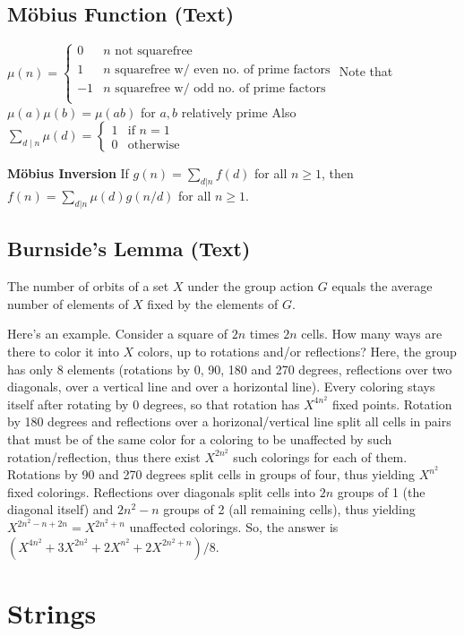 \documentclass[9pt]{extarticle}
\begin{document}
\begin{multicols*}{3}
\subsection{M\"obius Function (Text)} %
$\mu(n) = \begin{cases}
0 & \text{$n$ not squarefree} \\
1 & \text{$n$ squarefree w/ even no. of prime factors} \\
-1 & \text{$n$ squarefree w/ odd no. of prime factors} \\
\end{cases}$
Note that $\mu(a) \mu(b) = \mu(ab)$ for $a, b$ relatively prime
Also $\sum_{d \mid n} \mu(d) = \begin{cases} 1 & \text{if $n = 1$} \\
0 & \text{otherwise} \end{cases}$

\textbf{M\"obius Inversion}
If $g(n) = \sum_{d|n} f(d)$ for all $n \ge 1$, then
$f(n) = \sum_{d|n} \mu(d)g(n/d)$ for all $n \ge 1$.

\subsection{Burnside's Lemma (Text)} %
The number of orbits of a set $X$ under the group action $G$ equals the average
number of elements of $X$ fixed by the elements of $G$.

Here's an example. Consider a square of $2n$ times $2n$ cells. How many ways
are there to color it into $X$ colors, up to rotations and/or reflections?
Here, the group has only 8 elements (rotations by 0, 90, 180 and 270 degrees,
reflections over two diagonals, over a vertical line and over a horizontal
line). Every coloring stays itself after rotating by 0 degrees, so that
rotation has $X^{4n^2}$ fixed points. Rotation by 180 degrees and reflections
over a horizonal/vertical line split all cells in pairs that must be of the
same color for a coloring to be unaffected by such rotation/reflection, thus
there exist $X^{2n^2}$ such colorings for each of them. Rotations by 90 and 270
degrees split cells in groups of four, thus yielding $X^{n^2}$ fixed colorings.
Reflections over diagonals split cells into $2n$ groups of 1 (the diagonal
itself) and $2n^2-n$ groups of 2 (all remaining cells), thus yielding
$X^{2n^2-n+2n}=X^{2n^2+n}$ unaffected colorings.  So, the answer is
$(X^{4n^2}+3X^{2n^2}+2X^{n^2}+2X^{2n^2+n})/8$.

\section{Strings}


\end{multicols*}
\end{document}
